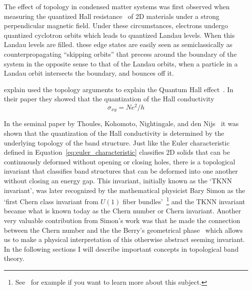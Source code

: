 The effect of topology in condensed matter systems was first observed when measuring the quantized Hall resistance~\cite{klitzing_new_1980} of 2D materials under a strong perpendicular magnetic field. Under these circumstances, electrons undergo quantized cyclotron orbits which leads to quantized Landau levels. When this Landau levels are filled. these edge states are easily seen as semiclassically as
counterpropagating “skipping orbits” that precess around the
boundary of the system in the opposite sense to that of the
Landau orbits, when a particle in a Landau orbit intersects
the boundary, and bounces off it.


explain used the topology arguments to explain the Quantum Hall effect~\cite{thouless_quantized_1982}. In their paper they showed that the quantization of the Hall conductivity
%
\begin{equation}
	\sigma_{xy} = Ne^2/h
	\label{eq:hall_conductivity}
\end{equation}


In the seminal paper by Thoules, Kohomoto, Nightingale, and den Nijs~\cite{thouless_quantized_1982} it was shown that the quantization of the Hall conductivity is determined by the underlying topology of the band structure. Just like the Euler characteristic defined in Equation~\ref{eq:euler_characteristic} classifies 2D solids that can be continuously deformed without opening or closing holes, there is a topological invariant that classifies band structures that can be deformed into one another without closing an energy gap. This invariant, initially known as the `TKNN invariant', was later recognized by the mathematical physicist Bary Simon as the `first Chern class invariant from $U(1)$ fiber bundles'~\cite{simon_holonomy_1983}\footnote{See~\cite{geometry_topology_physics} for example if you want to learn more about this subject.} and the TKNN invariant became what is known today as the Chern number or Chern invariant. Another very valuable contribution from Simon's work was that he made the connection between the Chern number and the the Berry's geometrical phase~\cite{berry_michael_victor_quantal_1984} which allows us to make a physical interpretation of this otherwise abstract seeming invariant. In the following sections I will describe important concepts in topological band theory. 

